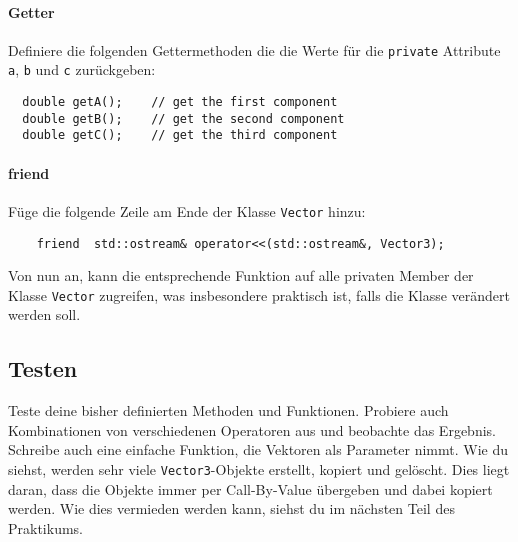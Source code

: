 \paragraph{Getter}
Definiere die folgenden Gettermethoden die die Werte für die \lstinline{private} Attribute \lstinline{a}, \lstinline{b} und \lstinline{c} zurückgeben:
\begin{lstlisting}
  double getA();	// get the first component
  double getB();	// get the second component
  double getC();	// get the third component
\end{lstlisting}

\paragraph{friend}
Füge die folgende Zeile am Ende der Klasse \texttt{Vector} hinzu:
\begin{lstlisting}
    friend  std::ostream& operator<<(std::ostream&, Vector3);
\end{lstlisting}
Von nun an, kann die entsprechende Funktion auf alle privaten Member der Klasse \texttt{Vector} zugreifen, was insbesondere praktisch ist, falls die Klasse verändert werden soll.



\subsection{Testen}
Teste deine bisher definierten Methoden und Funktionen.
Probiere auch Kombinationen von verschiedenen Operatoren aus und beobachte das Ergebnis.
Schreibe auch eine einfache Funktion, die Vektoren als Parameter nimmt.
Wie du siehst, werden sehr viele \lstinline{Vector3}-Objekte erstellt, kopiert und gelöscht.
Dies liegt daran, dass die Objekte immer per Call-By-Value übergeben und dabei kopiert werden.
Wie dies vermieden werden kann, siehst du im nächsten Teil des Praktikums.

